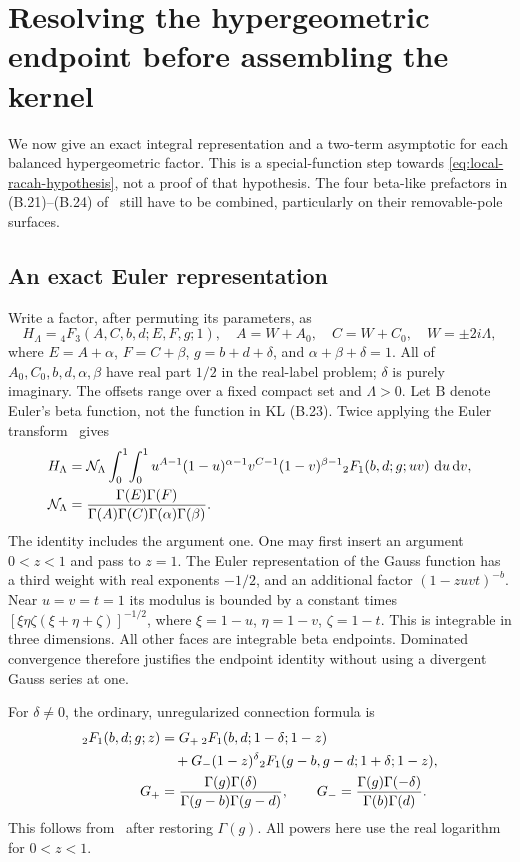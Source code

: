 \section{Resolving the hypergeometric endpoint before assembling the kernel}
\label{sec:endpoint}
We now give an exact integral representation and a two-term asymptotic
for each balanced hypergeometric factor. This is a special-function step
towards \eqref{eq:local-racah-hypothesis}, not a proof of that hypothesis.
The four beta-like prefactors in (B.21)--(B.24) of~\cite{KL} still have
to be combined, particularly on their removable-pole surfaces.

\subsection{An exact Euler representation}
Write a factor, after permuting its parameters, as
\begin{equation}
 H_\Lambda={}_4F_3(A,C,b,d;E,F,g;1),\quad
 A=W+A_0,\quad C=W+C_0,\quad W=\pm2i\Lambda,
 \label{eq:endpoint-H}
\end{equation}
where $E=A+\alpha$, $F=C+\beta$, $g=b+d+\delta$, and
$\alpha+\beta+\delta=1$. All of $A_0,C_0,b,d,\alpha,\beta$
have real part $1/2$ in the real-label problem; $\delta$ is purely
imaginary. The offsets range over a fixed compact set and $\Lambda>0$.
Let $\mathrm B$ denote Euler's beta function, not the function in KL (B.23).
Twice applying the Euler transform~\cite[16.5.2]{DLMF} gives
\begin{align}
 H_\Lambda&=\mathcal N_\Lambda\int_0^1\!\int_0^1
 u^{A-1}(1-u)^{\alpha-1}v^{C-1}(1-v)^{\beta-1}
 {}_2F_1(b,d;g;uv)\,\mathop{}\!\mathrm d u\mathop{}\!\mathrm d v,\notag\\
 \mathcal N_\Lambda&=
 \frac{\Gamma(E)\Gamma(F)}
 {\Gamma(A)\Gamma(C)\Gamma(\alpha)\Gamma(\beta)}.
 \label{eq:endpoint-exact-euler}
\end{align}
The identity includes the argument one. One may first insert an argument
$0<z<1$ and pass to $z=1$. The Euler representation of the Gauss function
has a third weight with real exponents $-1/2$, and an additional factor
$(1-zuvt)^{-b}$. Near $u=v=t=1$ its modulus is bounded by a constant times
$[\xi\eta\zeta(\xi+\eta+\zeta)]^{-1/2}$, where
$\xi=1-u$, $\eta=1-v$, $\zeta=1-t$. This is integrable in three dimensions.
All other faces are integrable beta endpoints. Dominated convergence
therefore justifies the endpoint identity without using a divergent
Gauss series at one.

For $\delta\ne0$, the ordinary, unregularized connection formula is
\begin{align}
 {}_2F_1(b,d;g;z)
 &=G_+\,{}_2F_1(b,d;1-\delta;1-z)\notag\\
 &\quad+G_- (1-z)^\delta
 {}_2F_1(g-b,g-d;1+\delta;1-z),\notag\\
 G_+&=\frac{\Gamma(g)\Gamma(\delta)}
 {\Gamma(g-b)\Gamma(g-d)},\qquad
 G_-=\frac{\Gamma(g)\Gamma(-\delta)}{\Gamma(b)\Gamma(d)}.
 \label{eq:endpoint-connection}
\end{align}
This follows from~\cite[15.8.4]{DLMF} after restoring $\Gamma(g)$.
All powers here use the real logarithm for $0<z<1$.


